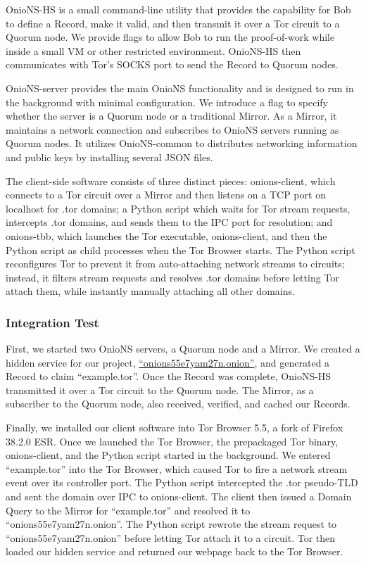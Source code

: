 \documentclass[conference]{IEEEtran}
\begin{document}
OnioNS-HS is a small command-line utility that provides the capability for Bob to define a Record, make it valid, and then transmit it over a Tor circuit to a Quorum node. We provide flags to allow Bob to run the proof-of-work while inside a small VM or other restricted environment. OnioNS-HS then communicates with Tor's SOCKS port to send the Record to Quorum nodes.

OnioNS-server provides the main OnioNS functionality and is designed to run in the background with minimal configuration. We introduce a flag to specify whether the server is a Quorum node or a traditional Mirror. As a Mirror, it maintains a network connection and subscribes to OnioNS servers running as Quorum nodes. It utilizes OnioNS-common to distributes networking information and public keys by installing several JSON files.

The client-side software consists of three distinct pieces: onions-client, which connects to a Tor circuit over a Mirror and then listens on a TCP port on localhost for .tor domains; a Python script which waits for Tor stream requests, intercepts .tor domains, and sends them to the IPC port for resolution; and onions-tbb, which launches the Tor executable, onions-client, and then the Python script as child processes when the Tor Browser starts. The Python script reconfigures Tor to prevent it from auto-attaching network streams to circuits; instead, it filters stream requests and resolves .tor domains before letting Tor attach them, while instantly manually attaching all other domains.

\subsubsection{Integration Test}

First, we started two OnioNS servers, a Quorum node and a Mirror. We created a hidden service for our project, \href{http://onions55e7yam27n.onion}{``onions55e7yam27n.onion''}, and generated a Record to claim ``example.tor''. Once the Record was complete, OnioNS-HS transmitted it over a Tor circuit to the Quorum node. The Mirror, as a subscriber to the Quorum node, also received, verified, and cached our Records.

Finally, we installed our client software into Tor Browser 5.5, a fork of Firefox 38.2.0 ESR. Once we launched the Tor Browser, the prepackaged Tor binary, onions-client, and the Python script started in the background. We entered ``example.tor'' into the Tor Browser, which caused Tor to fire a network stream event over its controller port. The Python script intercepted the .tor pseudo-TLD and sent the domain over IPC to onions-client. The client then issued a Domain Query to the Mirror for ``example.tor'' and resolved it to ``onions55e7yam27n.onion''. The Python script rewrote the stream request to ``onions55e7yam27n.onion'' before letting Tor attach it to a circuit. Tor then loaded our hidden service and returned our webpage back to the Tor Browser.
\end{document}
